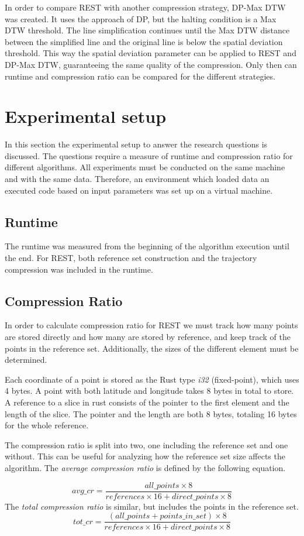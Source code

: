 In order to compare REST with another compression strategy, DP-Max DTW was created. It uses the approach of DP, but the halting condition is a Max DTW threshold. The line simplification continues until the Max DTW distance between the simplified line and the original line is below the spatial deviation threshold. This way the spatial deviation parameter can be applied to REST and DP-Max DTW, guaranteeing the same quality of the compression. Only then can runtime and compression ratio can be compared for the different strategies.

\section{Experimental setup}
In this section the experimental setup to answer the research questions is discussed. The questions require a measure of runtime and compression ratio for different algorithms. All experiments must be conducted on the same machine and with the same data. Therefore, an environment which loaded data an executed code based on input parameters was set up on a virtual machine.

\subsection{Runtime}
The runtime was measured from the beginning of the algorithm execution until the end. For REST, both reference set construction and the trajectory compression was included in the runtime.
\subsection{Compression Ratio}
In order to calculate compression ratio for REST we must track how many points are stored directly and how many are stored by reference, and keep track of the points in the reference set. Additionally, the sizes of the different element must be determined.

Each coordinate of a point is stored as the Rust type \textit{i32} (fixed-point), which uses 4 bytes. A point with both latitude and longitude takes 8 bytes in total to store. A reference to a slice in rust consists of the pointer to the first element and the length of the slice. The pointer and the length are both 8 bytes, totaling 16 bytes for the whole reference.

The compression ratio is split into two, one including the reference set and one without. This can be useful for analyzing how the reference set size affects the algorithm. The \textit{average compression ratio} is defined by the following equation.

\begin{equation}\label{eq:avg_cr}
    avg\_cr = \frac{all\_points \times 8}{references \times 16 + direct\_points \times 8}
\end{equation}
The \textit{total compression ratio} is similar, but includes the points in the reference set.
\begin{equation}\label{eq:tot_cr}
    tot\_cr = \frac{(all\_points + points\_in\_set) \times 8}{references \times 16 + direct\_points \times 8}
\end{equation}


